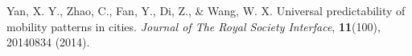 \documentclass[aps,preprint]{revtex4-1}
\begin{document}
\begin{thebibliography}{prsty}
%
%
%
%
%
%
%
%
%
%
%
%
%
%
%
%
%
%
%
%
%
 Yan, X. Y., Zhao, C., Fan, Y., Di, Z., \& Wang, W. X.  Universal predictability of mobility patterns in cities. {\it Journal of The Royal Society Interface}, {\bf 11}(100), 20140834 (2014).
%
%
%
%
%
%

\end{thebibliography}
\end{document}
